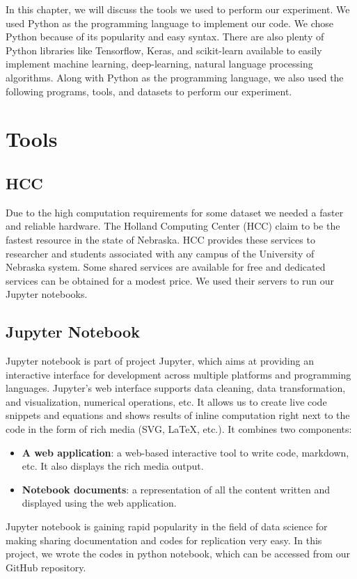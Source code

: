 In this chapter, we will discuss the tools we used to perform our experiment. 
We used Python as the programming language to implement our code. We chose Python because of its popularity and easy syntax. There are also plenty of Python libraries like Tensorflow, Keras, and scikit-learn available to easily implement machine learning, deep-learning, natural language processing algorithms. Along with Python as the programming language, we also used the following programs, tools, and datasets to perform our experiment.
 \section{Tools}
\subsection{HCC}
Due to the high computation requirements for some dataset we needed a faster and reliable hardware. The Holland Computing Center (HCC) claim to be the fastest resource in the state of Nebraska. HCC provides these services to researcher and students associated with any campus of the University of Nebraska system. Some shared services are available for free and dedicated services can be obtained for a modest price. We used their servers to run our Jupyter notebooks.

\subsection{Jupyter Notebook}
Jupyter notebook is part of project Jupyter, which aims at providing an interactive interface for development across multiple platforms and programming languages. Jupyter's web interface supports data cleaning, data transformation, and visualization, numerical operations, etc. It allows us to create live code snippets and equations and shows results of inline computation right next to the code in the form of rich media (SVG, LaTeX, etc.). It combines two components: 
\begin{itemize}
  \item \textbf{A web application}: a web-based interactive tool to write code, markdown, etc. It also displays the rich media output.
  \item \textbf{Notebook documents}: a representation of all the content written and displayed using the web application.
\end{itemize}
Jupyter notebook is gaining rapid popularity in the field of data science for making sharing documentation and codes for replication very easy. In this project, we wrote the codes in python notebook, which can be accessed from our GitHub repository.

